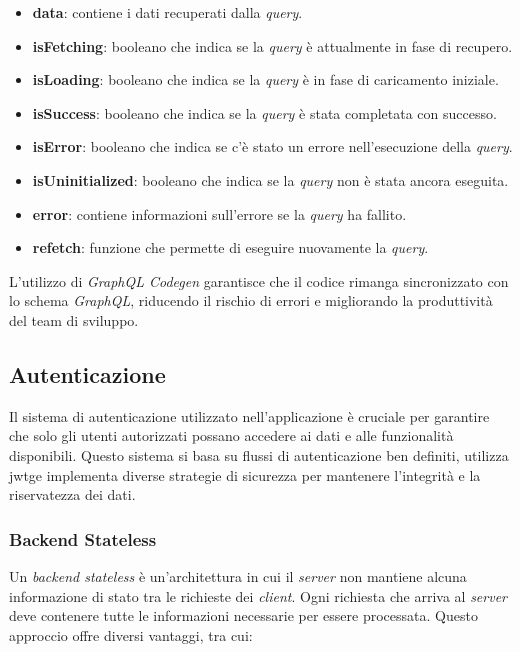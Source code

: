\begin{itemize}
  \item \textbf{data}: contiene i dati recuperati dalla \textit{query}.
  \item \textbf{isFetching}: booleano che indica se la \textit{query} è attualmente in fase di recupero.
  \item \textbf{isLoading}: booleano che indica se la \textit{query} è in fase di caricamento iniziale.
  \item \textbf{isSuccess}: booleano che indica se la \textit{query} è stata completata con successo.
  \item \textbf{isError}: booleano che indica se c'è stato un errore nell'esecuzione della \textit{query}.
  \item \textbf{isUninitialized}: booleano che indica se la \textit{query} non è stata ancora eseguita.
  \item \textbf{error}: contiene informazioni sull'errore se la \textit{query} ha fallito.
  \item \textbf{refetch}: funzione che permette di eseguire nuovamente la \textit{query}.
\end{itemize}

L'utilizzo di \textit{GraphQL Codegen} garantisce che il codice rimanga sincronizzato con lo schema \textit{GraphQL}, 
riducendo il rischio di errori e migliorando la produttività del team di sviluppo.





\subsection{Autenticazione}
\label{subsec:autenticazione}

Il sistema di autenticazione utilizzato nell'applicazione è cruciale per garantire che solo gli utenti autorizzati possano accedere ai dati e alle funzionalità disponibili.
Questo sistema si basa su flussi di autenticazione ben definiti, utilizza \gls{jwtg}\glox e implementa diverse strategie di sicurezza per mantenere l'integrità e la riservatezza dei dati.

\subsubsection{Backend Stateless}
Un \textit{backend stateless} è un'architettura in cui il \textit{server} non mantiene alcuna informazione di stato tra le richieste dei \textit{client}.
Ogni richiesta che arriva al \textit{server} deve contenere tutte le informazioni necessarie per essere processata.
Questo approccio offre diversi vantaggi, tra cui:

